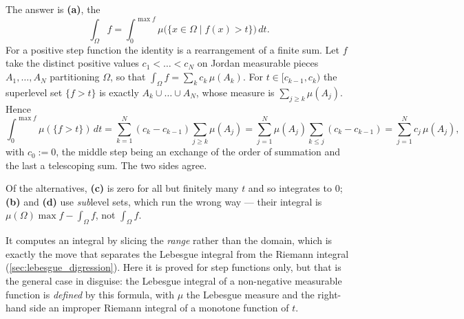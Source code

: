 \begin{exercisesolution}
\label{sol:kobel_layer_cake}
The answer is \textbf{(a)}, the 
\[\int_\Omega f = \int_0^{\max f}\mu\big(\{x \in \Omega \mid f(x) > t\}\big)\,dt .\]
For a positive step function the identity is a rearrangement of a finite sum. Let $f$ take the
distinct positive values $c_1 < \dots < c_N$ on Jordan measurable pieces $A_1,\dots,A_N$
partitioning $\Omega$, so that $\int_\Omega f = \sum_k c_k\,\mu(A_k)$. For $t \in
[c_{k-1},c_k)$ the superlevel set $\{f > t\}$ is exactly $A_k \cup \dots \cup A_N$, whose measure
is $\sum_{j \ge k}\mu(A_j)$. Hence
\[\int_0^{\max f}\mu(\{f>t\})\,dt
  = \sum_{k=1}^{N}(c_k - c_{k-1})\sum_{j\ge k}\mu(A_j)
  = \sum_{j=1}^{N}\mu(A_j)\sum_{k\le j}(c_k-c_{k-1})
  = \sum_{j=1}^N c_j\,\mu(A_j),\]
with $c_0 := 0$, the middle step being an exchange of the order of summation and the last a
telescoping sum. The two sides agree.

Of the alternatives, \textbf{(c)} is zero for all but finitely many $t$ and so integrates to $0$;
\textbf{(b)} and \textbf{(d)} use \emph{sub}level sets, which run the wrong way --- their integral
is $\mu(\Omega)\max f - \int_\Omega f$, not $\int_\Omega f$.
\begin{remark}
It computes an integral by slicing the \emph{range} rather than the domain, which is exactly the
move that separates the Lebesgue integral from the Riemann integral
(\cref{sec:lebesgue_digression}). Here it is proved for step functions only, but that is the
general case in disguise: the Lebesgue integral of a non-negative measurable function is
\emph{defined} by this formula, with $\mu$ the Lebesgue measure and the right-hand side an
improper Riemann integral of a monotone function of $t$.
\end{remark}
\end{exercisesolution}
